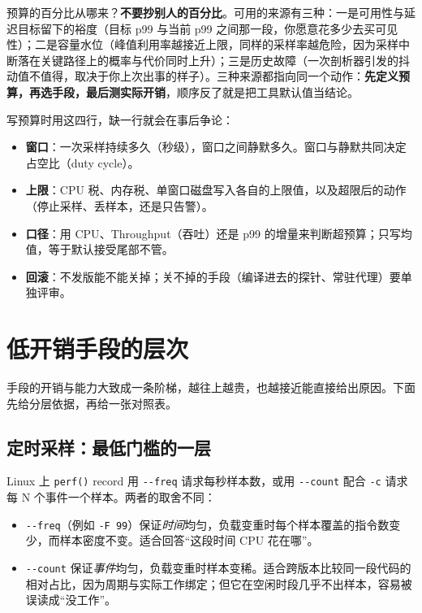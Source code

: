\documentclass[12pt,a4paper,fontset=fandol]{ctexbook}
\newcommand{\Fn}[1]{\texttt{#1()}}
\newcommand{\Tp}[1]{\texttt{#1}}
\newcommand{\Opt}[1]{\texttt{-\/-#1}}
\newcommand{\Lang}[1]{\textsf{#1}}
\newcommand{\MCpu}{\Lang{CPU}}
\newcommand{\MThr}{\Lang{Throughput}}
\newcommand{\Mx}[1]{\textsf{#1}}
\begin{document}
预算的百分比从哪来？\textbf{不要抄别人的百分比}。可用的来源有三种：一是可用性与延迟目标留下的裕度（目标 \Mx{p99} 与当前 \Mx{p99} 之间那一段，你愿意花多少去买可见性）；二是容量水位（峰值利用率越接近上限，同样的采样率越危险，因为采样中断落在关键路径上的概率与代价同时上升）；三是历史故障（一次剖析器引发的抖动值不值得，取决于你上次出事的样子）。三种来源都指向同一个动作：\textbf{先定义预算，再选手段，最后测实际开销}，顺序反了就是把工具默认值当结论。

\begin{guideline}[title={观测预算的四要素模板}]
\label{box:pm14-budget-tpl}
写预算时用这四行，缺一行就会在事后争论：
\begin{itemize}
  \item \textbf{窗口}：一次采样持续多久（秒级），窗口之间静默多久。窗口与静默共同决定占空比（\Mx{duty cycle}）。
  \item \textbf{上限}：CPU 税、内存税、单窗口磁盘写入各自的上限值，以及超限后的动作（停止采样、丢样本，还是只告警）。
  \item \textbf{口径}：用 \MCpu{}、\MThr{}（吞吐）还是 \Mx{p99} 的增量来判断超预算；只写均值，等于默认接受尾部不管。
  \item \textbf{回滚}：不发版能不能关掉；关不掉的手段（编译进去的探针、常驻代理）要单独评审。
\end{itemize}
\end{guideline}

\section{低开销手段的层次}
\label{sec:pm14-methods}

手段的开销与能力大致成一条阶梯，越往上越贵，也越接近能直接给出原因。下面先给分层依据，再给一张对照表。

\subsection{定时采样：最低门槛的一层}
\label{sub:pm14-timer}

Linux 上 \Fn{perf} record 用 \Opt{freq} 请求每秒样本数，或用 \Opt{count} 配合 \Tp{-c} 请求每 N 个事件一个样本。两者的取舍不同：

\begin{itemize}
  \item \Opt{freq}（例如 \Tp{-F 99}）保证\emph{时间}均匀，负载变重时每个样本覆盖的指令数变少，而样本密度不变。适合回答``这段时间 CPU 花在哪''。
  \item \Opt{count} 保证\emph{事件}均匀，负载变重时样本变稀。适合跨版本比较同一段代码的相对占比，因为周期与实际工作绑定；但它在空闲时段几乎不出样本，容易被误读成``没工作''。
\end{itemize}
\end{document}
